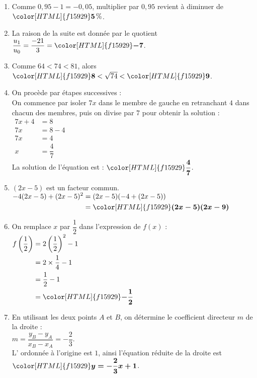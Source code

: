 \documentclass[a4paper,11pt,landscape,exos]{nsi} %
\begin{document}
\begin{multicols}{2}
\begin{enumerate}[]
\item Comme $0{,}95-1=-0{,}05$, multiplier par $0{,}95$ revient à diminuer de ${\color[HTML]{f15929}\boldsymbol{5}}\,\%$. 
\item La raison de la suite est donnée par le quotient $\dfrac{u_1}{u_0}=\dfrac{-21}{3}={\color[HTML]{f15929}\boldsymbol{-7}}$.
\item Comme $64 < 74 < 81$, alors 
    ${\color[HTML]{f15929}\boldsymbol{8}} < \sqrt{74} < {\color[HTML]{f15929}\boldsymbol{9}}$.
\item On procède par étapes successives :\\
      On commence par isoler $7x$ dans le membre de gauche en retranchant
      $4$ dans chacun des membres, puis on divise
      par $7$ pour obtenir la solution : \\
       $\begin{aligned}
       7x+4&=8\\
      7x&=8-4\\
      7x&=4\\
      x&=\dfrac{4}{7}    
      \end{aligned}$\\
      La solution de l'équation est : ${\color[HTML]{f15929}\boldsymbol{\dfrac{4}{7}}}$.
      
\item $(2x-5)$ est un facteur commun.\\
      $\begin{aligned}
      -4(2x-5)+(2x-5)^2
      &=(2x-5)(-4+(2x-5))\\
      &={\color[HTML]{f15929}\boldsymbol{(2x-5)(2x-9)}}\end{aligned}$

\item  On remplace $x$ par $\dfrac{1}{2}$ dans l'expression de $f(x)$ :\\
      $\begin{aligned}
      f\left(\dfrac{1}{2}\right)&=2\left(\dfrac{1}{2}\right)^2-1\\
      &=2\times \dfrac{1}{4}-1\\
      &=\dfrac{1}{2}-1\\
      &={\color[HTML]{f15929}\boldsymbol{-\dfrac{1}{2}}}
      \end{aligned}$

\vfill\null
\columnbreak
\item En utilisant les deux points $A$ et $B$, on détermine le coefficient directeur $m$ de la droite : \\
    $m=\dfrac{y_B-y_A}{x_B-x_A}=-\dfrac{2}{3}$.\\
         L' ordonnée à l'origine est $1$, ainsi l'équation réduite de la droite est ${\color[HTML]{f15929}\boldsymbol{y=-\dfrac{2}{3}x+1}}$.


\end{enumerate}
\end{multicols}
\end{document}
